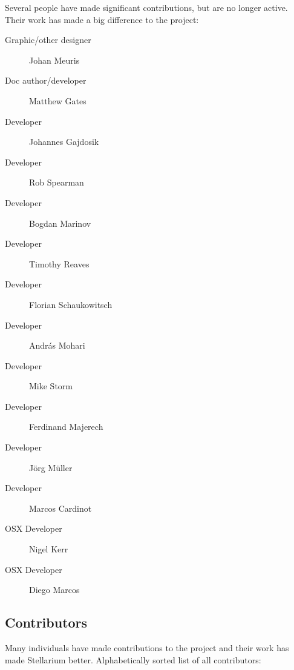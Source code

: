 Several people have made significant contributions, but are no longer active. Their work has made a big difference to the project:
\begin{description}
\item[Graphic/other designer] Johan Meuris
\item[Doc author/developer] Matthew Gates
\item[Developer] Johannes Gajdosik
\item[Developer] Rob Spearman
\item[Developer] Bogdan Marinov
\item[Developer] Timothy Reaves
\item[Developer] Florian Schaukowitsch
\item[Developer] András Mohari
\item[Developer] Mike Storm
\item[Developer] Ferdinand Majerech
\item[Developer] Jörg Müller
\item[Developer] Marcos Cardinot
\item[OSX Developer] Nigel Kerr
\item[OSX Developer] Diego Marcos
\end{description}

\subsection{Contributors}

Many individuals have made contributions to the project and their work has made Stellarium better. Alphabetically sorted list of all contributors:


